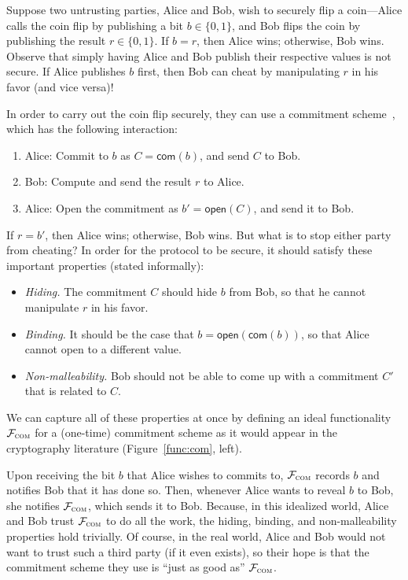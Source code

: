   Suppose two untrusting parties, Alice
and Bob, wish to securely flip a coin---Alice calls the coin flip by publishing a
bit $b \in \{ 0, 1\}$, and Bob flips the coin by publishing the result $r \in \{0,
1\}$. If $b = r$, then Alice wins; otherwise, Bob wins. Observe that simply
having Alice and Bob publish their respective values is not secure. If Alice
publishes $b$ first, then Bob can cheat by manipulating $r$ in his favor (and
vice versa)!

In order to carry out the coin flip securely, they can use a commitment
scheme~\cite{brassard1988minimum}, which has the following interaction:
\begin{enumerate}[leftmargin=*]
\item Alice: Commit to $b$ as $C = \mathsf{com}(b)$, and send $C$ to Bob.
\item Bob: Compute and send the result $r$ to Alice.
\item Alice: Open the commitment as $b' = \mathsf{open}(C)$, and send it to Bob.
\end{enumerate}
\noindent If $r = b'$, then Alice wins; otherwise, Bob wins. But what is to stop
either party from cheating? In order for the protocol to be secure, it should
satisfy these important properties (stated informally):
\begin{itemize}[leftmargin=*]
  \item \emph{Hiding.} The commitment $C$ should hide $b$ from Bob, so that he
    cannot manipulate $r$ in his favor.
  \item \emph{Binding.} It should be the case that $b =
    \mathsf{open}(\mathsf{com}(b))$, so that Alice cannot open to a different
    value.
  \item \emph{Non-malleability.} Bob should not be able to come up with a
    commitment $C'$ that is related to $C$.
\end{itemize}

 We can capture all of these properties at
once by defining an ideal functionality $\mathcal{{F}}_{\textsc{com}}$ for a (one-time)
commitment scheme as it would appear in the cryptography literature
(Figure~\ref{func:com}, left).

Upon receiving the bit $b$ that Alice wishes to commits to,
$\mathcal{{F}}_{\textsc{com}}$ records $b$ and notifies Bob that it has done so. Then,
whenever Alice wants to reveal $b$ to Bob, she notifies $\mathcal{{F}}_{\textsc{com}}$,
which sends it to Bob. Because, in this idealized world, Alice and Bob trust
$\mathcal{{F}}_{\textsc{com}}$ to do all the work, the hiding, binding, and
non-malleability properties hold trivially. Of course, in the real world, Alice
and Bob would not want to trust such a third party (if it even exists), so their
hope is that the commitment scheme they use is ``just as good as''
$\mathcal{{F}}_{\textsc{com}}$.\smallskip


